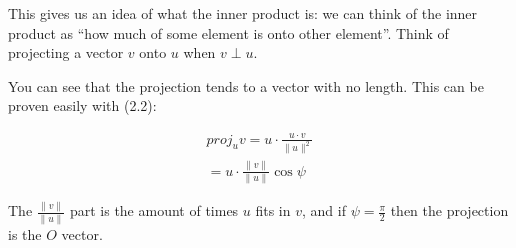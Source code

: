 \documentclass{book}
\begin{document}
This gives us an idea of what the inner product is: we can think of the inner
product as ``how much of some element is onto other element''. Think of
projecting a vector $v$ onto $u$ when $v\perp u$.

\begin{center}
\end{center}

You can see that the projection tends to a vector with no length. This can be
proven easily with (2.2):

\begin{equation}
    \begin{split}
        proj_u v = u\cdot\frac{u\cdot v}{\|u\|^{2}}
        \\ = u\cdot\frac{\|v\|}{\|u\|} \cos\psi
    \end{split}
\end{equation}

The $\frac{\|v\|}{\|u\|}$ part is the amount of times $u$ fits in $v$, and if
$\psi = \frac{\pi}{2}$ then the projection is the $O$ vector.
\end{document}
